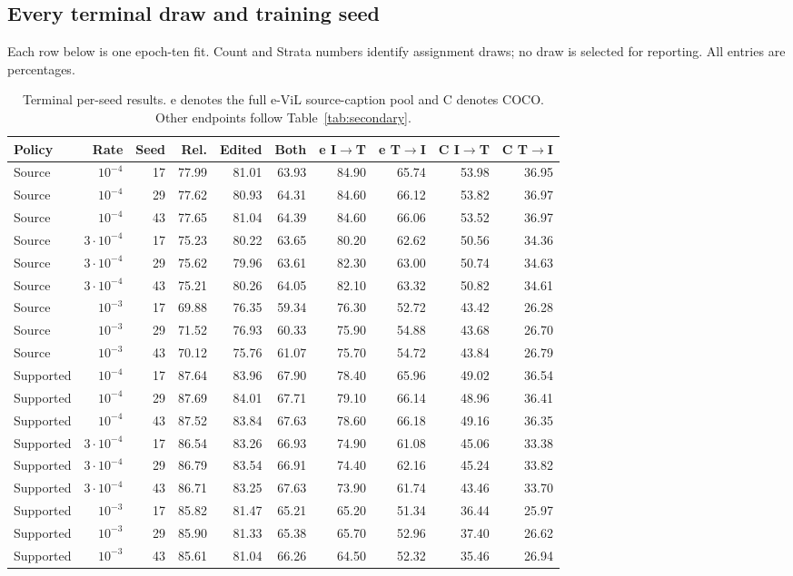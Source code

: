 \subsection{Every terminal draw and training seed}
Each row below is one epoch-ten fit. Count and Strata numbers identify assignment draws; no draw is selected for reporting. All entries are percentages.
\begin{table}[t]
\nolinenumbers
\centering
\small
\setlength{\tabcolsep}{3pt}
\begin{tabular}{lrrrrrrrrr}
\toprule
Policy & Rate & Seed & Rel. & Edited & Both & e I$\to$T & e T$\to$I & C I$\to$T & C T$\to$I\\
\midrule
Source & $10^{-4}$ & 17 & 77.99 & 81.01 & 63.93 & 84.90 & 65.74 & 53.98 & 36.95\\
Source & $10^{-4}$ & 29 & 77.62 & 80.93 & 64.31 & 84.60 & 66.12 & 53.82 & 36.97\\
Source & $10^{-4}$ & 43 & 77.65 & 81.04 & 64.39 & 84.60 & 66.06 & 53.52 & 36.97\\
Source & $3\cdot10^{-4}$ & 17 & 75.23 & 80.22 & 63.65 & 80.20 & 62.62 & 50.56 & 34.36\\
Source & $3\cdot10^{-4}$ & 29 & 75.62 & 79.96 & 63.61 & 82.30 & 63.00 & 50.74 & 34.63\\
Source & $3\cdot10^{-4}$ & 43 & 75.21 & 80.26 & 64.05 & 82.10 & 63.32 & 50.82 & 34.61\\
Source & $10^{-3}$ & 17 & 69.88 & 76.35 & 59.34 & 76.30 & 52.72 & 43.42 & 26.28\\
Source & $10^{-3}$ & 29 & 71.52 & 76.93 & 60.33 & 75.90 & 54.88 & 43.68 & 26.70\\
Source & $10^{-3}$ & 43 & 70.12 & 75.76 & 61.07 & 75.70 & 54.72 & 43.84 & 26.79\\
Supported & $10^{-4}$ & 17 & 87.64 & 83.96 & 67.90 & 78.40 & 65.96 & 49.02 & 36.54\\
Supported & $10^{-4}$ & 29 & 87.69 & 84.01 & 67.71 & 79.10 & 66.14 & 48.96 & 36.41\\
Supported & $10^{-4}$ & 43 & 87.52 & 83.84 & 67.63 & 78.60 & 66.18 & 49.16 & 36.35\\
Supported & $3\cdot10^{-4}$ & 17 & 86.54 & 83.26 & 66.93 & 74.90 & 61.08 & 45.06 & 33.38\\
Supported & $3\cdot10^{-4}$ & 29 & 86.79 & 83.54 & 66.91 & 74.40 & 62.16 & 45.24 & 33.82\\
Supported & $3\cdot10^{-4}$ & 43 & 86.71 & 83.25 & 67.63 & 73.90 & 61.74 & 43.46 & 33.70\\
Supported & $10^{-3}$ & 17 & 85.82 & 81.47 & 65.21 & 65.20 & 51.34 & 36.44 & 25.97\\
Supported & $10^{-3}$ & 29 & 85.90 & 81.33 & 65.38 & 65.70 & 52.96 & 37.40 & 26.62\\
Supported & $10^{-3}$ & 43 & 85.61 & 81.04 & 66.26 & 64.50 & 52.32 & 35.46 & 26.94\\
\bottomrule
\end{tabular}
\caption{Terminal per-seed results. e denotes the full e-ViL source-caption pool and C denotes COCO. Other endpoints follow Table~\ref{tab:secondary}.}\label{tab:futerm0}
\end{table}
